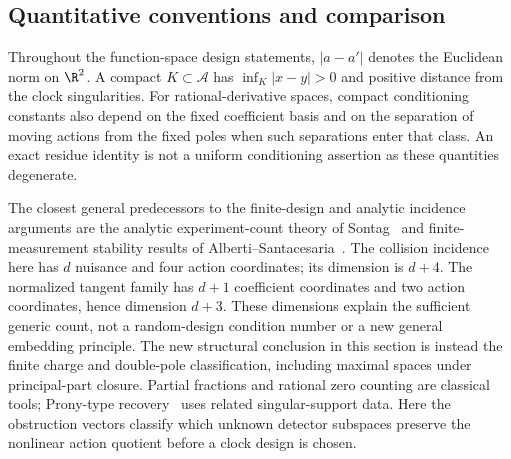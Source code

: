 \subsection{Quantitative conventions and comparison}
Throughout the function-space design statements, $|a-a'|$ denotes
the Euclidean norm on $\R^2$. A compact $K\subset\mathcal A$ has
$\inf_K|x-y|>0$ and positive distance from the clock singularities.
For rational-derivative spaces, compact conditioning constants also
depend on the fixed coefficient basis and on the separation of moving
actions from the fixed poles when such separations enter that class.
An exact residue identity is not a uniform conditioning assertion as
these quantities degenerate.

The closest general predecessors to the finite-design and analytic
incidence arguments are the analytic experiment-count theory of
Sontag~\cite{V85Sontag} and finite-measurement stability results of
Alberti--Santacesaria~\cite{V85AS}. The collision incidence here has
$d$ nuisance and four action coordinates; its dimension is $d+4$.
The normalized tangent family has $d+1$ coefficient coordinates and
two action coordinates, hence dimension $d+3$. These dimensions explain
the sufficient generic count, not a random-design condition number
or a new general embedding principle. The new structural conclusion
in this section is instead the finite charge and double-pole
classification, including maximal spaces under principal-part closure.
Partial fractions and rational zero counting are classical tools;
Prony-type recovery~\cite{V84BY} uses related singular-support data.
Here the obstruction vectors classify which unknown detector
subspaces preserve the nonlinear action quotient before a clock design
is chosen.
